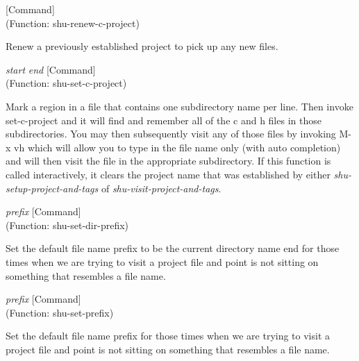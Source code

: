 \vspace{1em}
\noindent
{}
\usebox{\funcname}
 \hfill [Command]\\%
 (Function: shu-renew-c-project)

\begin{doc-string}
Renew a previously established project to pick up any new files.
\end{doc-string}

\vspace{1em}
\noindent
{}
\usebox{\funcname}\emph{start} \emph{end}
 \hfill [Command]\\%
 (Function: shu-set-c-project)

\begin{doc-string}
Mark a region in a file that contains one subdirectory name per line.  Then
invoke set-c-project and it will find and remember all of the c and h files in
those subdirectories.  You may then subsequently visit any of those files by
invoking M-x vh which will allow you to type in the file name only (with auto
completion) and will then visit the file in the appropriate subdirectory.  If
this function is called interactively, it clears the project name that was
established by either \emph{shu-setup-project-and-tags} of \emph{shu-visit-project-and-tags}.
\end{doc-string}

\vspace{1em}
\noindent
{}
\usebox{\funcname}\emph{prefix}
 \hfill [Command]\\%
 (Function: shu-set-dir-prefix)

\begin{doc-string}
Set the default file name prefix to be the current directory name end for those
times when we are trying to visit a project file and point is not sitting on
something that resembles a file name.
\end{doc-string}

\vspace{1em}
\noindent
{}
\usebox{\funcname}\emph{prefix}
 \hfill [Command]\\%
 (Function: shu-set-prefix)

\begin{doc-string}
Set the default file name prefix for those times when we are trying to visit
a project file and point is not sitting on something that resembles a file name.
\end{doc-string}

